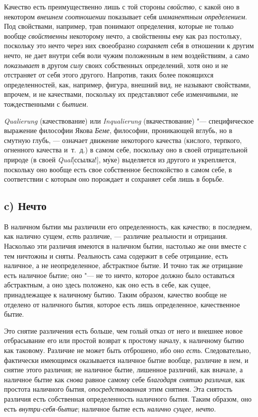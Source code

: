 Качество есть преимущественно лишь с той стороны
{\em свойство}, с какой оно в некотором
{\em внешнем соотношении} показывает себя
{\em имманентным определением}. Под свойствами,
например, трав понимают определения, которые не только вообще
{\em свойственны} некоторому нечто, а свойственны ему
как раз постольку, поскольку это нечто через них своеобразно
{\em сохраняет} себя в отношении к другим нечто, не
дает внутри себя воли чужим положенным в нем воздействиям, а само
{\em показывает} в другом
{\em силу} своих собственных определений, хотя оно и не
отстраняет от себя этого другого. Напротив, таких более покоящихся
определенностей, как, например, фигура, внешний вид, не называют
свойствами, впрочем, и не качествами, поскольку их представляют себе
изменчивыми, не тождественными с {\em бытием}.

{\em Qualierung} (качествование) или
{\em Inqualierung} (вкачествование) "--- специфическое
выражение философии Якова {\em Беме}, философии,
проникающей вглубь, но в смутную глубь, — означает движение некоторого
качества (кислого, терпкого, огненного качества и~т.~д.) в самом себе,
поскольку оно в своей отрицательной природе (в своей
{\em Qual}[ссылка!],
м\`{у}ке) выделяется из другого и укрепляется, поскольку оно
вообще есть свое собственное беспокойство в самом себе, в соответствии с
которым оно порождает и сохраняет себя лишь в борьбе.

\subsection*{c) Нечто}
В наличном бытии мы различили его определенность, как качество; в последнем,
как налично сущем, {\em есть} различие, — различие
реальности и отрицания. Насколько эти различия имеются в наличном бытии,
настолько же они вместе с тем ничтожны и сняты. Реальность сама содержит в
себе отрицание, есть наличное, а не неопределенное, абстрактное бытие. И
точно так же отрицание есть наличное бытие; оно "--- не то ничто, которое
должно было оставаться абстрактным, а оно здесь положено, как оно есть в
себе, как сущее, принадлежащее к наличному бытию. Таким образом, качество
вообще не отделено от наличного бытия, которое есть лишь определенное,
качественное бытие.

Это снятие различения есть больше, чем голый отказ от него и внешнее новое
отбрасывание его или простой возврат к простому началу, к наличному бытию
как таковому. Различие не может быть отброшено, ибо оно
{\em есть}. Следовательно, фактически имеющимся
оказывается наличное бытие вообще, различие в нем, и снятие этого различия;
не наличное бытие, лишенное различий, как вначале, а наличное бытие как
{\em снова} равное самому себе
{\em благодаря снятию различия}, как простота наличного
бытия, {\em опосредствованная} этим снятием. Эта
снятость различия есть собственная определенность наличного бытия. Таким
образом, оно есть {\em внутри-себя-бытие}; наличное
бытие есть {\em налично сущее, нечто}.


